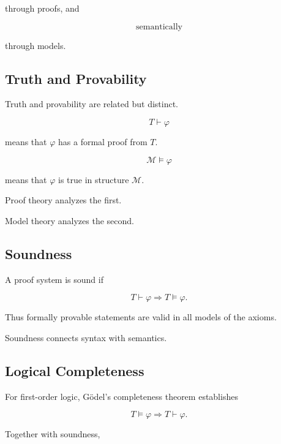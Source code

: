 through proofs, and

\[
\boxed{
\text{semantically}
}
\]

through models.

\subsection{Truth and Provability}
\label{subsec:truth-and-provability}

Truth and provability are related but distinct.

\[
\boxed{
T\vdash\varphi
}
\]

means that \(\varphi\) has a formal proof from \(T\).

\[
\boxed{
\mathcal{M}\models\varphi
}
\]

means that \(\varphi\) is true in structure \(\mathcal{M}\).

Proof theory analyzes the first.

Model theory analyzes the second.

\subsection{Soundness}
\label{subsec:foundational-soundness}

A proof system is sound if

\[
\boxed{
T\vdash\varphi
\Longrightarrow
T\models\varphi.
}
\]

Thus formally provable statements are valid in all models of the axioms.

Soundness connects syntax with semantics.

\subsection{Logical Completeness}
\label{subsec:foundational-logical-completeness}

For first-order logic, Gödel's completeness theorem establishes

\[
\boxed{
T\models\varphi
\Longrightarrow
T\vdash\varphi.
}
\]

Together with soundness,

